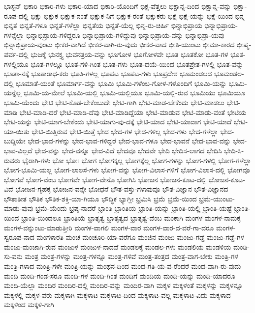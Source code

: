 {ಭಾಸ್ಟನ್
ಭಿಕಾರಿ
ಭಿಕಾರಿ-ಗಳು
ಭಿಕಾರಿ-ಯಾದ
ಭಿಕಾರಿ-ಯೊಂದಿಗೆ
ಭಿಕ್ಷ-ವೆತ್ತಲು
ಭಿಕ್ಷಾನ್ನ-ದಿಂದ
ಭಿಕ್ಷಾನ್ನ-ವನ್ನು
ಭಿಕ್ಷಾ-ರೂಪ-ದಲ್ಲಿ
ಭಿಕ್ಷು
ಭಿಕ್ಷುಕ
ಭಿಕ್ಷುಕ-ನಂತೆ
ಭಿಕ್ಷುಕ-ನಿಗೆ
ಭಿಕ್ಷುಕ-ರಂತೆ
ಭಿಕ್ಷುಕರು
ಭಿಕ್ಷೆ
ಭಿಕ್ಷೆ-ಯನ್ನು
ಭಿಕ್ಷೆ-ಯಿಂದ
ಭಿನ್ನ
ಭಿನ್ನತೆ
ಭಿನ್ನತೆ-ಗಳೂ
ಭಿನ್ನತೆ-ಗಳೆಲ್ಲಾ
ಭಿನ್ನತೆಯ
ಭಿನ್ನತೆ-ಯೆಲ್ಲ
ಭಿನ್ನ-ರು-ಚಿರ್ಹಿ
ಭಿನ್ನಾಭಿಪ್ರಾಯ
ಭಿನ್ನಾಭಿಪ್ರಾಯ-ಗಳನ್ನೆಲ್ಲಾ
ಭಿನ್ನಾಭಿಪ್ರಾಯ-ಗಳಿದ್ದರೂ
ಭಿನ್ನಾಭಿಪ್ರಾಯ-ಗಳಿದ್ದುವು
ಭಿನ್ನಾಭಿಪ್ರಾಯ-ವನ್ನು
ಭಿನ್ನಾಭಿಪ್ರಾ-ಯವು
ಭಿನ್ನಾಭಿಪ್ರಾಯ-ವುಂಟು
ಭೀಕರ-ವಾಗಿದೆ
ಭೀಕರ-ವಾಗಿ-ರು-ವುದು
ಭೀಕರ-ವಾದ
ಭೀತಿ-ಯುಂಟು
ಭೀಮಾ-ಕಾರದ
ಭೀಷ್ಮ-ಪರ್ವ-ದಲ್ಲಿ
ಭುಜಕ್ಕೆ
ಭುನಕ್ತ್ಯ
ಭುವನತ್ರಯ-ವನ್ನು
ಭೂಗೋಳ
ಭೂಗೋಳವೇ
ಭೂತ
ಭೂತಕೋ
ಭೂತ-ಗಳ
ಭೂತ-ಗಳಲ್ಲಿಯೂ
ಭೂತ-ಗಳಲ್ಲೂ
ಭೂತ-ಗಳಿ-ಗಿಂತ
ಭೂತ-ಗಳು
ಭೂತ-ದಯೆ-ಯಿಂದ
ಭೂತಪ್ರೇತ-ಗಳಲ್ಲಿ
ಭೂತ-ವನ್ನು
ಭೂತಾ-ನಕ್ಕೆ
ಭೂತಾರಾಧ-ಕರು
ಭೂತಿ-ಗಳಲ್ಲ
ಭೂಪಟ
ಭೂಪಟ-ಗಳು
ಭೂಪ್ರದೇಶ
ಭೂಮಂಡಲದ
ಭೂಮಂಡಲ-ದಲ್ಲಿ
ಭೂಮಾತೆ-ಯಂತೆ
ಭೂಮಾರ್ಗ-ವನ್ನು
ಭೂಮಿ
ಭೂಮಿ-ಗಳೆಂಬ-ಗೋಳ-ಗಳೊಂದಿಗೆ
ಭೂಮಿ-ಯನ್ನು
ಭೂಮಿ-ಯನ್ನೆಲ್ಲ
ಭೂಮಿ-ಯ-ಮೇಲೆ
ಭೂಮಿ-ಯಲ್ಲಿ
ಭೂಮಿ-ಯಲ್ಲಿಯೂ
ಭೂಮಿ-ಯಲ್ಲಿ-ರುವ
ಭೂಮಿಯು
ಭೂಮಿಯೂ
ಭೂಮಿ-ಯೆಂದು
ಭೇಟಿ
ಭೇಟಿ-ಕೊಡ-ಬೇಕೆಂಬುದೇ
ಭೇಟಿ-ಗಾಗಿ
ಭೇಟಿ-ಮಾಡ-ಬೇಕೆಂದು
ಭೇಟಿ-ಮಾಡಲು
ಭೇಟಿ-ಮಾಡಿ
ಭೇಟಿ-ಮಾಡಿ-ದರೆ
ಭೇಟಿ-ಮಾಡಿ-ದೆವು
ಭೇಟಿ-ಮಾಡಿದ್ದೆಯಾ
ಭೇಟಿ-ಮಾಡುವ
ಭೇಟಿ-ಮಾಡು-ವಂತೆ
ಭೇಟಿಯ
ಭೇಟಿ-ಯನ್ನು
ಭೇಟಿ-ಯಾಗ-ಬೇಕೆಂದು
ಭೇಟಿ-ಯಾಗು-ವು-ದಕ್ಕೆ
ಭೇಟಿ-ಯಾದ
ಭೇಟಿ-ಯಾದಾಗ
ಭೇಟಿ-ಯಾದೆ
ಭೇಟಿ-ಯಾ-ಯಿತು
ಭೇಟಿ-ಯಿತ್ತಿರುವ
ಭೇಟಿ-ಯಿತ್ತೆ
ಭೇದ
ಭೇದ-ಗಳ
ಭೇದ-ಗಳಿಲ್ಲ
ಭೇದ-ಗಳು
ಭೇದ-ಗಳೆಲ್ಲಾ
ಭೇದ-ಬುದ್ದಿಯೇ
ಭೇದ-ಭಾವ-ಗಳನ್ನು
ಭೇದ-ಭಾವ-ಗಳಿದ್ದರೆ
ಭೇದ-ಭಾವ-ಗಳೂ
ಭೇದ-ಭಾವನೆ
ಭೇದ-ಭಾವ-ವನ್ನು
ಭೇದ-ಭಾವ-ವಿಲ್ಲದೆ
ಭೇದ-ವನ್ನು
ಭೇದ-ವನ್ನೂ
ಭೇದ-ವಿದೆ
ಭೇದವೂ
ಭೇದವೇ
ಭೇದಿ
ಭೇದಿಸ-ಲಾಗದ
ಭೇದಿಸಿ
ಭೇದಿ-ಸಿ-ರುವರು
ಭೈರಾಗಿ-ಗಳು
ಭೋ
ಭೋಃ
ಭೋಗ
ಭೋಗಕ್ಕಲ್ಲ
ಭೋಗಕ್ಕೆಲ್ಲ
ಭೋಗ-ಗಳನ್ನು
ಭೋಗ-ಗಳಲ್ಲಿ
ಭೋಗ-ಗಳೆಲ್ಲಾ
ಭೋಗ-ಭೂಮಿ-ಯಲ್ಲ
ಭೋಗ-ಲಾಲಸೆ-ಗಳು
ಭೋಗ-ವನ್ನು
ಭೋಗ-ವಿಲಾಸ-ಗಳಿಗೆ
ಭೋಗ-ವಿಲಾಸ-ದಲ್ಲಿ
ಭೋಗವೂ
ಭೋಗವೆ
ಭೋಗ-ವೆಂಬ
ಭೋಗವೇ
ಭೋಗ-ವೇನೊ
ಭೋಗಿಸಿ
ಭೋಜನ
ಭೋಜನ-ಕೂಟ-ದಲ್ಲಿ
ಭೋಜನ-ಕೂಟ-ವಿದೆ
ಭೋಜನ-ಗೃಹಕ್ಕೆ
ಭೋಜನ-ವನ್ನೇ
ಭೋಧನೆ
ಭೌತ-ವಸ್ತು-ಗಳಾವುವೂ
ಭೌತ-ವಿಜ್ಞಾನ
ಭೌತ-ವಿಜ್ಞಾನದ
ಭೌತಾತೀತ
ಭೌತಿಕ
ಭೌತಿಕ-ಶಕ್ತಿ-ಯಾ-ಗಿಯೂ
ಭೌದ್ಧಿಕ
ಭ್ಯಾಗ್ಲೀ
ಭ್ರಮಿಸಿ
ಭ್ರಮೆ
ಭ್ರಮೆ-ಯಿಂದ
ಭ್ರಮೆ-ಯುಂಟು-ಮಾಡು-ವುವು
ಭ್ರಮೆ-ಯೆಂದು
ಭ್ರಷ್ಠ-ನಾದರೆ
ಭ್ರಾಂತಿ
ಭ್ರಾಂತಿಯ
ಭ್ರಾಂತಿ-ಯನ್ನು
ಭ್ರಾಂತಿ-ಯಲ್ಲಿ
ಭ್ರಾಂತಿ-ಯಷ್ಟೆ
ಭ್ರಾಂತಿ-ಯಿಂದ
ಭ್ರಾಂತಿ-ಯಿಂದಲೂ
ಭ್ರಾಂತಿಯೆ
ಭ್ರಾತೃತ್ವ
ಭ್ರಾತೃತ್ವದ
ಭ್ರಾತೃತ್ವ-ವೆಂಬ
ಮಂಕಾಗಿ
ಮಂಗಳ
ಮಂಗಳ-ನಾಮಕ್ಕೆ
ಮಂಗಳ-ವನ್ನುಂಟು-ಮಾಡುತ್ತೀರಿ
ಮಂಗಳ-ವಾಗಲಿ
ಮಂಗಳ-ವಾರ
ಮಂಗಳ-ವಾರ-ದ-ವರೆ-ಗಾ-ದರೂ
ಮಂಗಳ-ಸ್ವರೂಪ-ನಾದ
ಮಂಗಳಾರತಿ
ಮಂಚ
ಮಂಚೂರಿ-ಯಾ-ವರೆಗೂ
ಮಂಜಿನ
ಮಂಜು
ಮಂಜು-ಗಡ್ಡೆ
ಮಂಜು-ಗಡ್ಡೆ-ಗಳ
ಮಂಜು-ಮಂಜಾಗಿ-ರುವ
ಮಂಜುಳ
ಮಂಜುಳ-ನಾದವೆ
ಮಂಡಲಕ್ಕೆ
ಮಂಡಲ-ಗಳು
ಮಂಡಲಿಯ
ಮಂಡಳಿಯ
ಮಂಡಿ-ಸು-ವನು
ಮಂತ್ರ
ಮಂತ್ರ-ಗಳನ್ನು
ಮಂತ್ರ-ಗಳನ್ನೂ
ಮಂತ್ರ-ಗಳಿವೆ
ಮಂತ್ರ-ತಂತ್ರದ
ಮಂತ್ರ-ವಾಗ-ಬೇಕು
ಮಂತ್ರಿ-ಗಳ
ಮಂತ್ರಿ-ಗಳಾದ
ಮಂತ್ರಿ-ಗಳೇ
ಮಂತ್ರಿ-ಯನ್ನು
ಮಂಥನ-ದಿಂದ
ಮಂದ-ಗತಿ-ಯ-ವ-ರೆಂದರೆ
ಮಂದ-ವಾಗಿ-ರು-ವುದು
ಮಂದಿ
ಮಂದಿ-ಗಂಡ-ಸರೂ
ಮಂದಿ-ಗಳ
ಮಂದಿ-ಗಿಂತ
ಮಂದಿಗೆ
ಮಂದಿಯ
ಮಂದಿ-ಯನ್ನು
ಮಂದಿ-ಯಾದರೂ
ಮಂದಿ-ಯೆಲ್ಲಾ
ಮಂದಿರ
ಮಂದಿರ-ದಲ್ಲಿ
ಮಂದಿರ-ವನ್ನು
ಮಂದಿರ-ವಾಗಿ
ಮಕ್ಕಳ
ಮಕ್ಕಳಂತೆ
ಮಕ್ಕಳನ್ನು
ಮಕ್ಕಳನ್ನೂ
ಮಕ್ಕಳಲ್ಲಿ
ಮಕ್ಕಳ-ವರು
ಮಕ್ಕಳಾಗಿ
ಮಕ್ಕಳಾಟ
ಮಕ್ಕಳಾಟ-ದಿಂದ
ಮಕ್ಕಳಾಟ-ವಲ್ಲ
ಮಕ್ಕಳಾಟ-ವಿದು
ಮಕ್ಕಳಾದ
ಮಕ್ಕಳಿಂದ
ಮಕ್ಕಳಿ-ಗಾಗಿ
}

